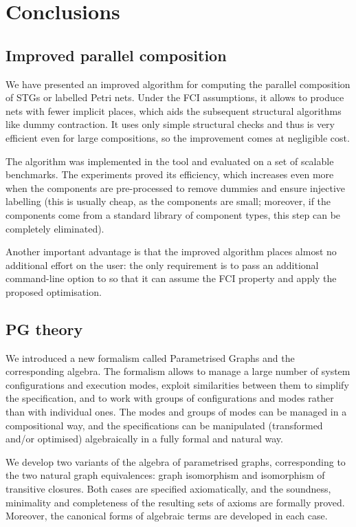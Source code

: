 \chapter{Conclusions\label{chap:Conclusion}}

\section{Improved parallel composition}

We have presented an improved algorithm for computing the
parallel composition of STGs or labelled Petri nets. Under the
FCI assumptions, it allows to produce nets with fewer implicit
places, which aids the subsequent structural algorithms like
dummy contraction. It uses only simple structural checks and
thus is very efficient even for large compositions, so the
improvement comes at negligible cost.

The algorithm was implemented in the \pcomp tool and evaluated
on a set of scalable benchmarks. The experiments proved its
efficiency, which increases even more when the components are
pre-processed to remove dummies and ensure injective labelling
(this is usually cheap, as the components are small; moreover,
if the components come from a standard library of component
types, this step can be completely eliminated).

Another important advantage is that the improved algorithm
places almost no additional effort on the user: the only
requirement is to pass an additional command-line option to
\pcomp so that it can assume the FCI property and apply the
proposed optimisation.


\section{PG theory}

We introduced a new formalism called Parametrised Graphs and the
corresponding algebra. The formalism allows to manage a large number
of system configurations and execution modes, exploit similarities
between them to simplify the specification, and to work with groups
of configurations and modes rather than with individual ones. The
modes and groups of modes can be managed in a compositional way, and
the specifications can be manipulated (transformed and/or optimised)
algebraically in a fully formal and natural way.

We develop two variants of the algebra of parametrised graphs, corresponding
to the two natural graph equivalences: graph isomorphism and isomorphism
of transitive closures. Both cases are specified axiomatically, and
the soundness, minimality and completeness of the resulting sets of
axioms are formally proved. Moreover, the canonical forms of algebraic
terms are developed in each case.

